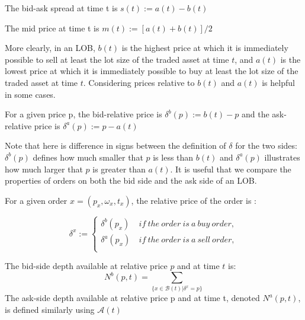 \begin{defn}
The bid-ask spread at time t is $s(t):=a(t)-b(t)$
\end{defn}

\begin{defn}
The mid price at time t is $m(t):=[a(t)+b(t)]/2$
\end{defn}

More clearly, in an LOB, $b(t)$ is the highest price at which it is immediately possible to sell at least the lot size of the traded asset at time $t$, and $a(t)$ is the lowest price at which it is immediately possible to buy at least the lot size of the traded asset at time $t$. Considering prices relative to $b(t)$ and $a(t)$ is helpful in some cases.\citep{gould2013limit}

\begin{defn}
For a given price p, the bid-relative price is $\delta^b(p):=b(t)-p$ and the ask-relative price is $\delta^a(p):= p-a(t)$ 
\end{defn}

Note that here is difference in signs between the definition of $\delta$ for the two sides:$\delta^b(p)$ defines how much smaller that $p$ is less than $b(t)$ and $\delta^a(p)$ illustrates how much larger that $p$ is greater than $a(t)$. It is useful that we compare the properties of orders on both the bid side and the ask side of an LOB. 

\begin{defn}
For a given order $x=(p_x,\omega_x ,t_x)$, the relative price of the order is :

\begin{equation*}
\delta^x:=\left\{
\begin{aligned}
\delta^b(p_x)&\ if\ the\ order\ is\ a\ buy\ order,\\
\delta^a(p_x)&\ if\ the\ order\ is\ a\ sell\ order,\\
\end{aligned}
\right.
\end{equation*}

\end{defn}

\begin{defn}
The bid-side depth available at relative price $p$ and at time $t$ is:
\begin{equation*}
N^b(p,t)=\sum_{\{x\in \mathcal{B}(t)|\delta^x=p\}}
\end{equation*}
The ask-side depth available at relative price p and at time t, denoted $N^a(p,t)$, is defined similarly using $\mathcal{A}(t)$
\end{defn}

